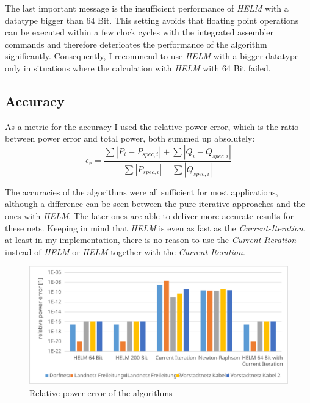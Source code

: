The last important message is the insufficient performance of \emph{HELM} with a datatype bigger than 64 Bit. This setting avoids that floating point operations can be executed within a few clock cycles with the integrated assembler commands and therefore deterioates the performance of the algorithm significantly. Consequently, I recommend to use \emph{HELM} with a bigger datatype only in situations where the calculation with \emph{HELM} with 64 Bit failed.

\subsection{Accuracy}

As a metric for the accuracy I used the relative power error, which is the ratio between power error and total power, both summed up absolutely:
\begin{equation}
	\epsilon_r = \frac{\sum |P_i - P_{spec,i}| + \sum |Q_i - Q_{spec,i}|}{\sum |P_{spec,i}| + \sum |Q_{spec,i}|}
\end{equation}

The accuracies of the algorithms  were all sufficient for most applications, although a difference can be seen between the pure iterative approaches and the ones with \emph{HELM}. The later ones are able to deliver more accurate results for these nets. Keeping in mind that \emph{HELM} is even as fast as the \emph{Current-Iteration}, at least in my implementation, there is no reason to use the \emph{Current Iteration} instead of \emph{HELM} or \emph{HELM} together with the \emph{Current Iteration}.

\begin{figure}
	\centering
	\includegraphics[scale=0.7]{figures/comparison_accuracy}
	\caption[Comparison, accuracy]{Relative power error of the algorithms}
	\label{fig:comparison_accuracy}
\end{figure}

